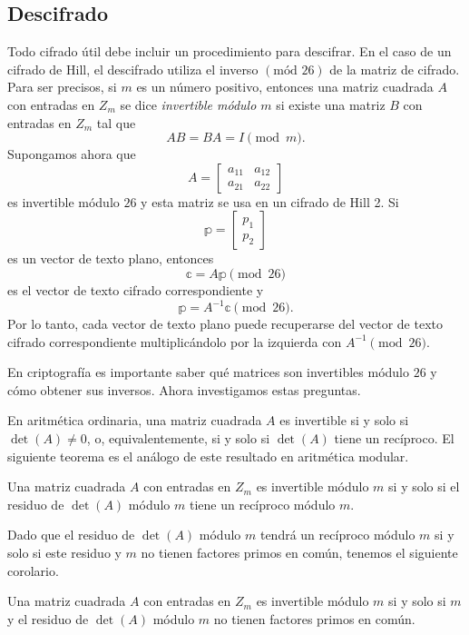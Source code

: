 \subsection*{Descifrado}

Todo cifrado útil debe incluir un procedimiento para descifrar. En el caso de un cifrado de Hill, el descifrado utiliza el inverso $(\text{mód } 26)$ de la matriz de cifrado. Para ser precisos, si $m$ es un número positivo, entonces una matriz cuadrada $A$ con entradas en $Z_m$ se dice \emph{invertible módulo $m$} si existe una matriz $B$ con entradas en $Z_m$ tal que
$$AB = BA = I \pmod{m}.$$
Supongamos ahora que
$$A = \begin{bmatrix}
    a_{11} & a_{12} \\
    a_{21} & a_{22}
\end{bmatrix}$$
es invertible módulo $26$ y esta matriz se usa en un cifrado de Hill 2. Si
$$\mathbb{p} = \begin{bmatrix}
    p_1 \\
    p_2
\end{bmatrix}$$
es un vector de texto plano, entonces
$$\mathbb{c} = A \mathbb{p} \pmod{26}$$
es el vector de texto cifrado correspondiente y
$$\mathbb{p} = A^{-1} \mathbb{c} \pmod{26}.$$
Por lo tanto, cada vector de texto plano puede recuperarse del vector de texto cifrado correspondiente multiplicándolo por la izquierda con $A^{-1} \pmod{26}$.

En criptografía es importante saber qué matrices son invertibles módulo $26$ y cómo obtener sus inversos. Ahora investigamos estas preguntas.

En aritmética ordinaria, una matriz cuadrada $A$ es invertible si y solo si $\det(A) \neq 0$, o, equivalentemente, si y solo si $\det(A)$ tiene un recíproco. El siguiente teorema es el análogo de este resultado en aritmética modular.

\begin{theorem}{}{}
    Una matriz cuadrada $A$ con entradas en $Z_m$ es invertible módulo $m$ si y solo si el residuo de $\det(A)$ módulo $m$ tiene un recíproco módulo $m$.
\end{theorem}

Dado que el residuo de $\det(A)$ módulo $m$ tendrá un recíproco módulo $m$ si y solo si este residuo y $m$ no tienen factores primos en común, tenemos el siguiente corolario.

\begin{corollary}{}{}
    Una matriz cuadrada $A$ con entradas en $Z_m$ es invertible módulo $m$ si y solo si $m$ y el residuo de $\det(A)$ módulo $m$ no tienen factores primos en común.
\end{corollary}

